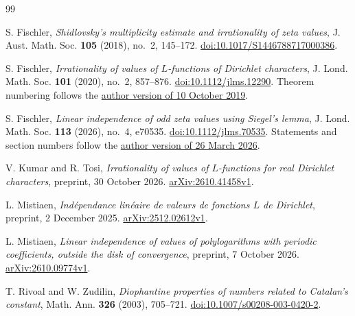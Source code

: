 \begin{thebibliography}{99}

S. Fischler,
\emph{Shidlovsky's multiplicity estimate and irrationality of zeta values},
J. Aust. Math. Soc. \textbf{105} (2018), no.~2, 145--172.
\href{https://doi.org/10.1017/S1446788717000386}{doi:10.1017/S1446788717000386}.

S. Fischler,
\emph{Irrationality of values of $L$-functions of Dirichlet characters},
J. Lond. Math. Soc. \textbf{101} (2020), no.~2, 857--876.
\href{https://doi.org/10.1112/jlms.12290}{doi:10.1112/jlms.12290}.
Theorem numbering follows the
\href{https://www.imo.universite-paris-saclay.fr/~stephane.fischler/Lschi.pdf}
{author version of 10 October 2019}.

S. Fischler,
\emph{Linear independence of odd zeta values using Siegel's lemma},
J. Lond. Math. Soc. \textbf{113} (2026), no.~4, e70535.
\href{https://doi.org/10.1112/jlms.70535}{doi:10.1112/jlms.70535}.
Statements and section numbers follow the
\href{https://www.imo.universite-paris-saclay.fr/~stephane.fischler/siegel.pdf}
{author version of 26 March 2026}.

V. Kumar and R. Tosi,
\emph{Irrationality of values of $L$-functions for real Dirichlet characters},
preprint, 30 October 2026.
\href{https://arxiv.org/abs/2610.41458v1}{arXiv:2610.41458v1}.

L. Mistiaen,
\emph{Ind\'ependance lin\'eaire de valeurs de fonctions $L$ de Dirichlet},
preprint, 2 December 2025.
\href{https://arxiv.org/abs/2512.02612v1}{arXiv:2512.02612v1}.

L. Mistiaen,
\emph{Linear independence of values of polylogarithms with periodic
coefficients, outside the disk of convergence},
preprint, 7 October 2026.
\href{https://arxiv.org/abs/2610.09774v1}{arXiv:2610.09774v1}.

T. Rivoal and W. Zudilin,
\emph{Diophantine properties of numbers related to Catalan's constant},
Math. Ann. \textbf{326} (2003), 705--721.
\href{https://doi.org/10.1007/s00208-003-0420-2}
{doi:10.1007/s00208-003-0420-2}.

\end{thebibliography}

